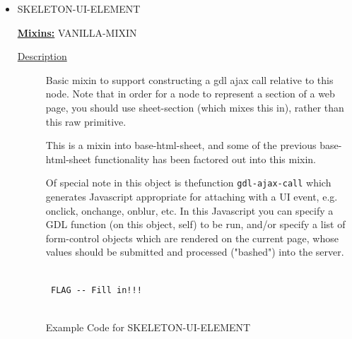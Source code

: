 \documentclass [11pt]{book}
\begin{document}
\begin{itemize}
\item {}SKELETON-UI-ELEMENT


\textbf{
\underline{Mixins:}} VANILLA-MIXIN





\begin{description}

\item [
\underline{Description}]


Basic mixin to support constructing a gdl ajax call 
relative to this node. Note that in order for a node to represent a section of a 
web page, you should use sheet-section (which mixes this in), rather than this raw 
primitive. 

This is a mixin into base-html-sheet, and some of the previous base-html-sheet 
functionality has been factored out into this mixin. 

Of special note in this object is thefunction \texttt{gdl-ajax-call} which generates 
Javascript appropriate for attaching with a UI event, e.g. onclick, onchange, 
onblur, etc. In this Javascript you can specify a GDL function (on this object, self) 
to be run, and/or specify a list of form-control objects which are rendered on 
the current page, whose values should be submitted and processed ("bashed") into the 
server.



\end{description}




\begin{figure}
\begin{lrbox}{\boxedverb}
\begin{minipage}{\linewidth}
{\small

\begin{verbatim}

 FLAG -- Fill in!!!


\end{verbatim}}
\end{minipage}
\end{lrbox}
\fbox{\usebox{\boxedverb}}

\caption{Example Code for SKELETON-UI-ELEMENT}

\label{fig:example-code-SKELETON-UI-ELEMENT}

\end{figure}






\end{itemize}
\end{document}
